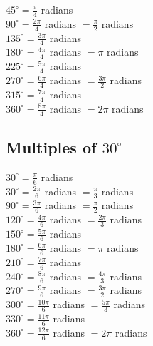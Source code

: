 \documentclass[12pt]{article}
\begin{document}
\begin{multicols}{2}
$45^\circ=\frac{\pi}{4}$ radians \\

$90^\circ=\frac{2\pi}{4}$ radians $=\frac{\pi}{2}$ radians \\

$135^\circ=\frac{3\pi}{4}$ radians \\

$180^\circ=\frac{4\pi}{4}$ radians $=\pi$ radians \\

$225^\circ=\frac{5\pi}{4}$ radians \\

$270^\circ=\frac{6\pi}{4}$ radians $=\frac{3\pi}{2}$ radians \\

$315^\circ=\frac{7\pi}{4}$ radians \\

$360^\circ=\frac{8\pi}{4}$ radians $=2\pi$ radians \\
\end{multicols}

\subsection*{Multiples of $30^\circ$}

\begin{multicols}{2}

$30^\circ=\frac{\pi}{6}$ radians \\

$30^\circ=\frac{2\pi}{6}$ radians $=\frac{\pi}{3}$ radians \\

$90^\circ=\frac{3\pi}{6}$ radians $=\frac{\pi}{2}$ radians \\
 
$120^\circ=\frac{4\pi}{6}$ radians $=\frac{2\pi}{3}$ radians \\

$150^\circ=\frac{5\pi}{6}$ radians \\
  
$180^\circ=\frac{6\pi}{6}$ radians $=\pi$ radians \\

$210^\circ=\frac{7\pi}{6}$ radians \\
   
$240^\circ=\frac{8\pi}{6}$ radians $=\frac{4\pi}{3}$ radians \\

$270^\circ=\frac{9\pi}{6}$ radians $=\frac{3\pi}{2}$ radians \\
    
$300^\circ=\frac{10\pi}{6}$ radians $=\frac{5\pi}{3}$ radians \\

 $330^\circ=\frac{11\pi}{6}$ radians\\
     
$360^\circ=\frac{12\pi}{6}$ radians $=2\pi$ radians \\

\end{multicols}
\end{document}
